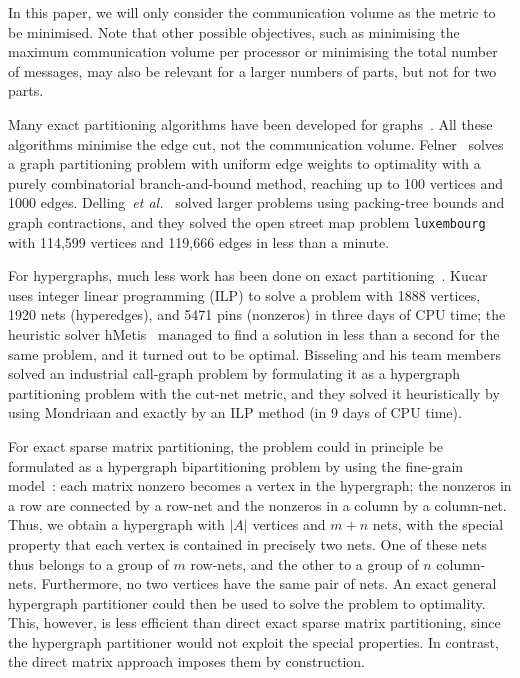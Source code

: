 In this paper, we will only consider the communication volume
as the metric to be minimised. 
Note that other possible objectives, such as 
minimising the maximum communication volume per processor
or minimising the total number of messages, 
may also be relevant for a larger numbers of parts,
but not for two parts.

Many exact partitioning algorithms have been developed for graphs~\cite{karisch00,sensen01,felner05,hager13,delling14}. All these algorithms minimise the edge cut,
not the communication volume.
Felner~\cite{felner05} solves a graph partitioning problem
with uniform edge weights to optimality
with a purely combinatorial branch-and-bound method,
reaching up to 100 vertices and 1000 edges.
Delling~\textit{et al.\ }\cite{delling14} solved larger problems
using packing-tree bounds and graph contractions, and they solved 
the open street map problem \texttt{luxembourg} with
114,599 vertices and 119,666 edges in less than a minute.

For hypergraphs, much less work has been
done on exact partitioning~\cite{caldwell00,kucar04,bisseling05}.
Kucar~\cite{kucar04} uses integer linear programming (ILP) 
to solve a problem with 1888 vertices, 1920 nets (hyperedges), and 5471
pins (nonzeros) in three days of CPU time; the heuristic solver
hMetis~\cite{karypis99b}
managed to find a solution in less than a second for the same problem,
and it turned out to be optimal.
Bisseling and his team members~\cite{bisseling05}
solved an industrial call-graph problem
by formulating it as a hypergraph partitioning problem with the cut-net metric,
and they solved it heuristically by using Mondriaan
and exactly by an ILP method (in 9 days of CPU time).

For exact sparse matrix partitioning,
the problem could in principle be formulated
as a hypergraph bipartitioning problem by using
the fine-grain model~\cite{catalyurek01}:
each matrix nonzero becomes a vertex in the hypergraph;
the nonzeros in a row are connected by a row-net  
and the nonzeros in a column by a column-net.
Thus, we obtain a hypergraph with $|A|$ vertices and $m+n$ nets,
with the special property that each vertex is
contained in precisely two nets.
One of these nets thus belongs to a group of $m$ row-nets, and the other to
a group of $n$ column-nets. Furthermore, no two vertices have the same pair
of nets.
An exact general hypergraph partitioner could then be used to solve
the problem to optimality. 
This, however, is less efficient than direct exact sparse matrix partitioning,
since the hypergraph partitioner would not exploit the special properties.
In contrast, the direct matrix approach imposes them
by construction.

